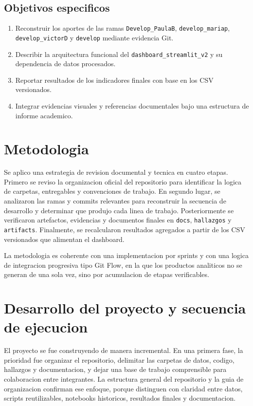 \documentclass[12pt,letterpaper]{article}
\begin{document}
\subsection{Objetivos especificos}

\begin{enumerate}[label=\arabic*.]
    \item Reconstruir los aportes de las ramas \texttt{Develop\_PaulaB}, \texttt{develop\_mariap}, \texttt{develop\_victorD} y \texttt{develop} mediante evidencia Git.
    \item Describir la arquitectura funcional del \texttt{dashboard\_streamlit\_v2} y su dependencia de datos procesados.
    \item Reportar resultados de los indicadores finales con base en los CSV versionados.
    \item Integrar evidencias visuales y referencias documentales bajo una estructura de informe academico.
\end{enumerate}

\section{Metodologia}

Se aplico una estrategia de revision documental y tecnica en cuatro etapas. Primero se reviso la organizacion oficial del repositorio para identificar la logica de carpetas, entregables y convenciones de trabajo. En segundo lugar, se analizaron las ramas y commits relevantes para reconstruir la secuencia de desarrollo y determinar que produjo cada linea de trabajo. Posteriormente se verificaron artefactos, evidencias y documentos finales en \texttt{docs}, \texttt{hallazgos} y \texttt{artifacts}. Finalmente, se recalcularon resultados agregados a partir de los CSV versionados que alimentan el dashboard.

La metodologia es coherente con una implementacion por sprints y con una logica de integracion progresiva tipo Git Flow, en la que los productos analiticos no se generan de una sola vez, sino por acumulacion de etapas verificables.

\section{Desarrollo del proyecto y secuencia de ejecucion}

El proyecto se fue construyendo de manera incremental. En una primera fase, la prioridad fue organizar el repositorio, delimitar las carpetas de datos, codigo, hallazgos y documentacion, y dejar una base de trabajo comprensible para colaboracion entre integrantes. La estructura general del repositorio y la guia de organizacion confirman ese enfoque, porque distinguen con claridad entre datos, scripts reutilizables, notebooks historicos, resultados finales y documentacion.
\end{document}

